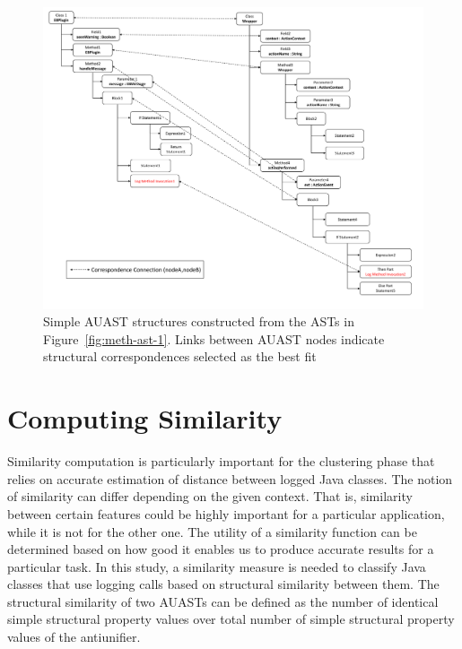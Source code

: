 \begin{figure} [H]
  \centering\includegraphics [width = \textwidth]{Drawing4/FinalCorr.pdf}
  \caption{Simple AUAST structures constructed from the ASTs in Figure~\ref{fig:meth-ast-1}. Links between AUAST nodes indicate structural correspondences selected as the best fit}
  \label{fig:AUASTs}
\end{figure}


\section{Computing Similarity} \label{meth-similarity}
Similarity computation is particularly important for the clustering phase that relies on accurate estimation of distance between logged Java classes. The notion of similarity can differ depending on the given context. That is, similarity between certain features could be highly important for a particular application, while it is not for the other one. The utility of a similarity function can be determined based on how good it enables us to produce accurate results for a particular task. In this study, a similarity measure is needed to classify Java classes that use logging calls based on structural similarity between them. The structural similarity of two AUASTs can be defined as the number of identical simple structural property values over total number of simple structural property values of the antiunifier.


